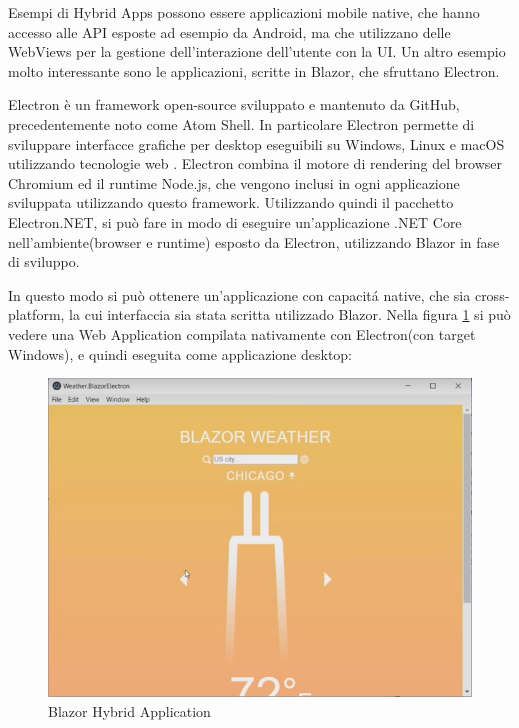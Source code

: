 Esempi di Hybrid Apps possono essere applicazioni mobile native, che hanno accesso alle API esposte ad esempio da Android, ma che utilizzano delle WebViews per la gestione dell'interazione dell'utente con la UI.
Un altro esempio molto interessante sono le applicazioni, scritte in Blazor, che sfruttano Electron.

Electron \`e un framework open-source sviluppato e mantenuto da GitHub, precedentemente noto come Atom Shell.
In particolare Electron permette di sviluppare interfacce grafiche per desktop eseguibili su Windows, Linux e macOS utilizzando tecnologie web \cite{electronWiki}.
Electron combina il motore di rendering del browser Chromium ed il runtime Node.js, che vengono inclusi in ogni applicazione sviluppata utilizzando questo framework.
Utilizzando quindi il pacchetto Electron.NET, si pu\`o fare in modo di eseguire un'applicazione .NET Core nell'ambiente(browser e runtime) esposto da Electron, utilizzando Blazor in fase di sviluppo\cite{electronDotNet}.

In questo modo si pu\`o ottenere un'applicazione con capacit\'a native, che sia cross-platform, la cui interfaccia sia stata scritta utilizzado Blazor.
Nella figura \ref{fig:BlazorHybridApplication} si pu\`o vedere una Web Application compilata nativamente con Electron(con target Windows), e quindi eseguita come applicazione desktop:

\begin{figure}[H]
	\centerline{\includegraphics[scale=0.6]{figure/BlazorWeatherElectron.png}}
	\caption{Blazor Hybrid Application}
	\label{fig:BlazorHybridApplication}
\end{figure}

